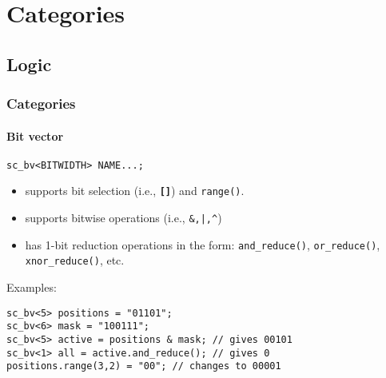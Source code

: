 \section{Categories}

\subsection{Logic}

\begin{frame}[fragile]
\frametitle{Categories}
\framesubtitle{Bit vector}

\begin{block}{\texttt{sc\_bv<BITWIDTH> NAME...;}}
\begin{itemize}
\item supports bit selection (i.e., {\bfseries \texttt{[]}}) and \texttt{range()}.
\item supports bitwise operations (i.e., \verb+&,|,^+)
\item has 1-bit reduction operations in the form: \texttt{and\_reduce()}, \texttt{or\_reduce()}, \texttt{xnor\_reduce()}, etc.
\end{itemize}
\end{block}
\pause
\begin{block}{Examples:} 
\vspace{-1em}
\begin{verbatim}
sc_bv<5> positions = "01101";
sc_bv<6> mask = "100111";
sc_bv<5> active = positions & mask; // gives 00101
sc_bv<1> all = active.and_reduce(); // gives 0
positions.range(3,2) = "00"; // changes to 00001
\end{verbatim}
\vspace{-1em}
\end{block}

\end{frame}

